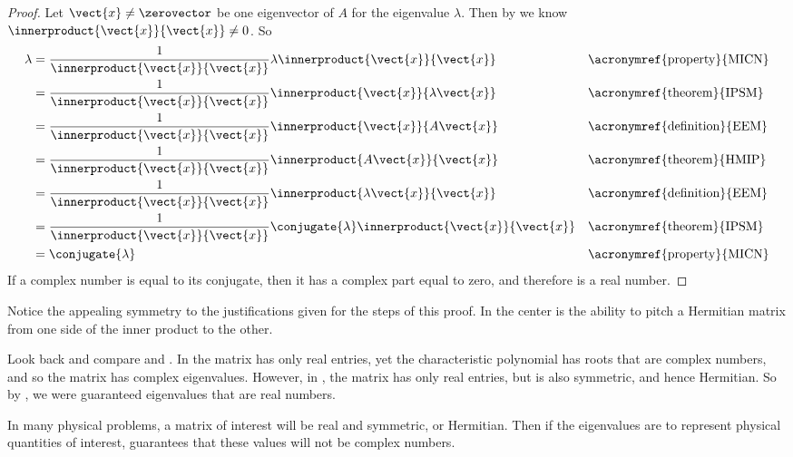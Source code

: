 \begin{proof}
Let $\vect{x}\neq\zerovector$ be one eigenvector of $A$ for the eigenvalue $\lambda$.   Then by  we know $\innerproduct{\vect{x}}{\vect{x}}\neq 0$.  So
%
\begin{align*}
\lambda
%
&=\frac{1}{\innerproduct{\vect{x}}{\vect{x}}}\lambda\innerproduct{\vect{x}}{\vect{x}}
&&\text{\acronymref{property}{MICN}}\\
%
&=\frac{1}{\innerproduct{\vect{x}}{\vect{x}}}\innerproduct{\vect{x}}{\lambda\vect{x}}
&&\text{\acronymref{theorem}{IPSM}}\\
%
&=\frac{1}{\innerproduct{\vect{x}}{\vect{x}}}\innerproduct{\vect{x}}{A\vect{x}}
&&\text{\acronymref{definition}{EEM}}\\
%
&=\frac{1}{\innerproduct{\vect{x}}{\vect{x}}}\innerproduct{A\vect{x}}{\vect{x}}
&&\text{\acronymref{theorem}{HMIP}}\\
%
&=\frac{1}{\innerproduct{\vect{x}}{\vect{x}}}\innerproduct{\lambda\vect{x}}{\vect{x}}
&&\text{\acronymref{definition}{EEM}}\\
%
&=\frac{1}{\innerproduct{\vect{x}}{\vect{x}}}\conjugate{\lambda}\innerproduct{\vect{x}}{\vect{x}}
&&\text{\acronymref{theorem}{IPSM}}\\
%
&=\conjugate{\lambda}
&&\text{\acronymref{property}{MICN}}
\end{align*}
%
If a complex number is equal to its conjugate, then it has a complex part equal to zero, and therefore is a real number.
%
\end{proof}
%
Notice the appealing symmetry to the justifications given for the steps of this proof.  In the center is the ability to pitch a Hermitian matrix from one side of the inner product to the other.\par
%
Look back and compare  and .   In  the matrix has only real entries, yet the characteristic polynomial has roots that are complex numbers, and so the matrix has complex eigenvalues.  However, in , the matrix has only real entries, but is also symmetric, and hence Hermitian.  So by , we were guaranteed eigenvalues that are real numbers.\par
%
In many physical problems, a matrix of interest will be real and symmetric, or Hermitian.  Then if the eigenvalues are to represent physical quantities of interest,  guarantees that these values will not be complex numbers.\par
